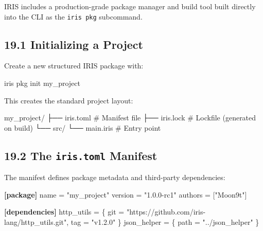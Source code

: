 \documentclass[
  english,
]{book}
\newenvironment{Shaded}{\begin{snugshade}}{\end{snugshade}}
\newcommand{\DataTypeTok}[1]{\textcolor[rgb]{0.31,0.79,0.69}{#1}}
\newcommand{\ExtensionTok}[1]{\textcolor[rgb]{0.83,0.83,0.83}{#1}}
\newcommand{\KeywordTok}[1]{\textcolor[rgb]{0.34,0.61,0.84}{\textbf{#1}}}
\newcommand{\NormalTok}[1]{\textcolor[rgb]{0.83,0.83,0.83}{#1}}
\newcommand{\OperatorTok}[1]{\textcolor[rgb]{0.83,0.83,0.83}{#1}}
\newcommand{\StringTok}[1]{\textcolor[rgb]{0.81,0.57,0.47}{#1}}
\begin{document}
IRIS includes a production-grade package manager and build tool built
directly into the CLI as the \texttt{iris\ pkg} subcommand.

\subsection{19.1 Initializing a Project}\label{initializing-a-project-1}

Create a new structured IRIS package with:

\begin{Shaded}
\begin{Highlighting}[]
\ExtensionTok{iris}\NormalTok{ pkg init my\_project}
\end{Highlighting}
\end{Shaded}

This creates the standard project layout:

\begin{Shaded}
\begin{Highlighting}[]
\NormalTok{my\_project/}
\NormalTok{├── iris.toml     \# Manifest file}
\NormalTok{├── iris.lock     \# Lockfile (generated on build)}
\NormalTok{└── src/}
\NormalTok{    └── main.iris \# Entry point}
\end{Highlighting}
\end{Shaded}

\subsection{\texorpdfstring{19.2 The \texttt{iris.toml}
Manifest}{19.2 The iris.toml Manifest}}\label{the-iris.toml-manifest-1}

The manifest defines package metadata and third-party dependencies:

\begin{Shaded}
\begin{Highlighting}[]
\KeywordTok{[package]}
\DataTypeTok{name} \OperatorTok{=} \StringTok{"my\_project"}
\DataTypeTok{version} \OperatorTok{=} \StringTok{"1.0.0{-}rc1"}
\DataTypeTok{authors} \OperatorTok{=} \OperatorTok{[}\StringTok{"Moon9t"}\OperatorTok{]}

\KeywordTok{[dependencies]}
\DataTypeTok{http\_utils} \OperatorTok{=} \OperatorTok{\{ }\DataTypeTok{git}\OperatorTok{ =} \StringTok{"https://github.com/iris{-}lang/http\_utils.git"}\OperatorTok{, }\DataTypeTok{tag}\OperatorTok{ =} \StringTok{"v1.2.0"}\OperatorTok{ \}}
\DataTypeTok{json\_helper} \OperatorTok{=} \OperatorTok{\{ }\DataTypeTok{path}\OperatorTok{ =} \StringTok{"../json\_helper"}\OperatorTok{ \}}
\end{Highlighting}
\end{Shaded}
\end{document}
